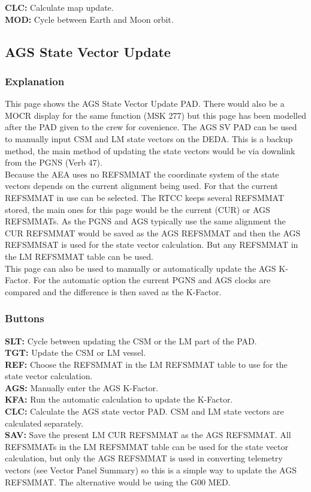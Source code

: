 \documentclass[11pt]{article} %
\begin{document}
\textbf{CLC:} Calculate map update.\\
\textbf{MOD:} Cycle between Earth and Moon orbit.\\
\newpage
\subsection{AGS State Vector Update}
\subsubsection{Explanation}
This page shows the AGS State Vector Update PAD. There would also be a MOCR display for the same function (MSK 277) but this page has been modelled after the PAD given to the crew for covenience. The AGS SV PAD can be used to manually input CSM and LM state vectors on the DEDA. This is a backup method, the main method of updating the state vectors would be via downlink from the PGNS (Verb 47).\\
Because the AEA uses no REFSMMAT the coordinate system of the state vectors depends on the current alignment being used. For that the current REFSMMAT in use can be selected. The RTCC keeps several REFSMMAT stored, the main ones for this page would be the current (CUR) or AGS REFSMMATs. As the PGNS and AGS typically use the same alignment the CUR REFSMMAT would be saved as the AGS REFSMMAT and then the AGS REFSMMSAT is used for the state vector calculation. But any REFSMMAT in the LM REFSMMAT table can be used.\\
This page can also be used to manually or automatically update the AGS K-Factor. For the automatic option the current PGNS and AGS clocks are compared and the difference is then saved as the K-Factor.\\
\subsubsection{Buttons}
\textbf{SLT:} Cycle between updating the CSM or the LM part of the PAD.\\
\textbf{TGT:} Update the CSM or LM vessel.\\
\textbf{REF:} Choose the REFSMMAT in the LM REFSMMAT table to use for the state vector calculation.\\
\textbf{AGS:} Manually enter the AGS K-Factor.\\
\textbf{KFA:} Run the automatic calculation to update the K-Factor.\\
\textbf{CLC:} Calculate the AGS state vector PAD. CSM and LM state vectors are calculated separately.\\
\textbf{SAV:} Save the present LM CUR REFSMMAT as the AGS REFSMMAT. All REFSMMATs in the LM REFSMMAT table can be used for the state vector calculation, but only the AGS REFSMMAT is used in converting telemetry vectors (see Vector Panel Summary) so this is a simple way to update the AGS REFSMMAT. The alternative would be using the G00 MED.\\
\newpage
\end{document}
